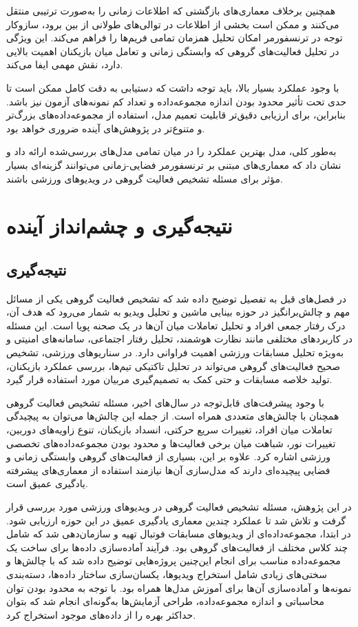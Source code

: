 \documentclass[12pt]{report}
\begin{document}
همچنین برخلاف معماری‌های بازگشتی که اطلاعات زمانی را به‌صورت ترتیبی منتقل می‌کنند و ممکن است بخشی از اطلاعات در توالی‌های طولانی از بین برود، سازوکار توجه در ترنسفورمر امکان تحلیل همزمان تمامی فریم‌ها را فراهم می‌کند. این ویژگی در تحلیل فعالیت‌های گروهی که وابستگی زمانی و تعامل میان بازیکنان اهمیت بالایی دارد، نقش مهمی ایفا می‌کند.

با وجود عملکرد بسیار بالا، باید توجه داشت که دستیابی به دقت کامل ممکن است تا حدی تحت تأثیر محدود بودن اندازه مجموعه‌داده و تعداد کم نمونه‌های آزمون نیز باشد. بنابراین، برای ارزیابی دقیق‌تر قابلیت تعمیم مدل، استفاده از مجموعه‌داده‌های بزرگ‌تر و متنوع‌تر در پژوهش‌های آینده ضروری خواهد بود.

به‌طور کلی، مدل  بهترین عملکرد را در میان تمامی مدل‌های بررسی‌شده ارائه داد و نشان داد که معماری‌های مبتنی بر ترنسفورمر فضایی-زمانی می‌توانند گزینه‌ای بسیار مؤثر برای مسئله تشخیص فعالیت گروهی در ویدیوهای ورزشی باشند.




\chapter{نتیجه‌گیری و چشم‌انداز آینده}

\section{نتیجه‌گیری}

در فصل‌های قبل به تفصیل توضیح داده شد که تشخیص فعالیت گروهی یکی از مسائل مهم و چالش‌برانگیز در حوزه بینایی ماشین و تحلیل ویدیو به شمار می‌رود که هدف آن، درک رفتار جمعی افراد و تحلیل تعاملات میان آن‌ها در یک صحنه پویا است. این مسئله در کاربردهای مختلفی مانند نظارت هوشمند، تحلیل رفتار اجتماعی، سامانه‌های امنیتی و به‌ویژه تحلیل مسابقات ورزشی اهمیت فراوانی دارد. در سناریوهای ورزشی، تشخیص صحیح فعالیت‌های گروهی می‌تواند در تحلیل تاکتیکی تیم‌ها، بررسی عملکرد بازیکنان، تولید خلاصه مسابقات و حتی کمک به تصمیم‌گیری مربیان مورد استفاده قرار گیرد.

با وجود پیشرفت‌های قابل‌توجه در سال‌های اخیر، مسئله تشخیص فعالیت گروهی همچنان با چالش‌های متعددی همراه است. از جمله این چالش‌ها می‌توان به پیچیدگی تعاملات میان افراد، تغییرات سریع حرکتی، انسداد بازیکنان، تنوع زاویه‌های دوربین، تغییرات نور، شباهت میان برخی فعالیت‌ها و محدود بودن مجموعه‌داده‌های تخصصی ورزشی اشاره کرد. علاوه بر این، بسیاری از فعالیت‌های گروهی وابستگی زمانی و فضایی پیچیده‌ای دارند که مدل‌سازی آن‌ها نیازمند استفاده از معماری‌های پیشرفته یادگیری عمیق است.

در این پژوهش، مسئله تشخیص فعالیت گروهی در ویدیوهای ورزشی مورد بررسی قرار گرفت و تلاش شد تا عملکرد چندین معماری یادگیری عمیق در این حوزه ارزیابی شود. در ابتدا، مجموعه‌داده‌ای از ویدیوهای مسابقات فوتبال تهیه و سازمان‌دهی شد که شامل چند کلاس مختلف از فعالیت‌های گروهی بود. فرآیند آماده‌سازی داده‌ها برای ساخت یک مجموعه‌داده مناسب برای انجام این‌چنین پروژه‌هایی توضیح داده شد که با چالش‌ها و سختی‌های زیادی شامل استخراج ویدیوها، یکسان‌سازی ساختار داده‌ها، دسته‌بندی نمونه‌ها و آماده‌سازی آن‌ها برای آموزش مدل‌ها همراه بود. با توجه به محدود بودن توان محاسباتی و اندازه مجموعه‌داده، طراحی آزمایش‌ها به‌گونه‌ای انجام شد که بتوان حداکثر بهره را از داده‌های موجود استخراج کرد.
\end{document}
